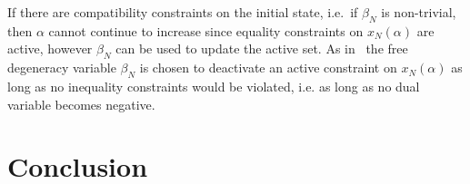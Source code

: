 \documentclass{ifacconf}
\begin{document}
If there are compatibility constraints on the initial state, i.e.\ if $\beta_N$ is non-trivial, then $\alpha$ cannot continue 
to  increase since equality constraints on $x_N(\alpha)$ are active, however $\beta_N$ can be used to update the active set. 
As in~\cite{Buerger:ACC} the free degeneracy variable $\beta_N$ is chosen to deactivate an active constraint on $x_N(\alpha)$ 
as long as no inequality constraints would be violated, i.e. as long as no dual variable becomes negative. 



\section{Conclusion}\label{sec:conclusion}

\end{document}
